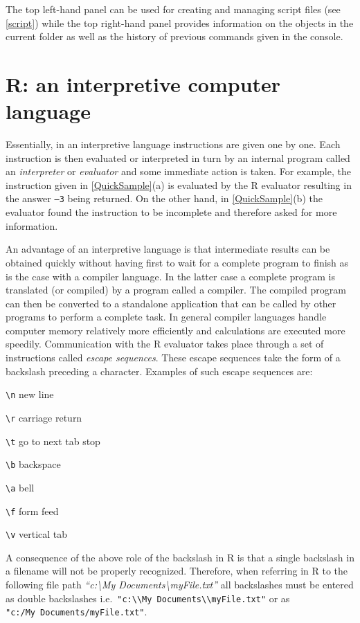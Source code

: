 \documentclass[
]{book}
\begin{document}
The top left-hand panel can be used for creating and managing script files (see \ref{script}) while the top right-hand panel provides information on the objects in the current folder as well as the history of previous commands given in the console.

\section{R: an interpretive computer language}\label{r-an-interpretive-computer-language}

Essentially, in an interpretive language instructions are given one by one. Each instruction is then evaluated or interpreted in turn by an internal program called an \emph{{interpreter}} or \emph{{evaluator}} and some immediate action is taken. For example, the instruction given in \ref{QuickSample}(a) is evaluated by the R evaluator resulting in the answer \texttt{–3} being returned. On the other hand, in \ref{QuickSample}(b) the evaluator found the instruction to be incomplete and therefore asked for more information.

An advantage of an interpretive language is that intermediate results can be obtained quickly without having first to wait for a complete program to finish as is the case with a compiler language. In the latter case a complete program is translated (or compiled) by a program called a compiler. The compiled program can then be converted to a standalone application that can be called by other programs to perform a complete task. In general compiler languages handle computer memory relatively more efficiently and calculations are executed more speedily.
Communication with the R evaluator takes place through a set of instructions called \emph{{escape sequences}}. These escape sequences take the form of a backslash preceding a character. Examples of such escape sequences are:

\texttt{\textbackslash{}n} new line

\texttt{\textbackslash{}r} carriage return

\texttt{\textbackslash{}t} go to next tab stop

\texttt{\textbackslash{}b} backspace

\texttt{\textbackslash{}a} bell

\texttt{\textbackslash{}f} form feed

\texttt{\textbackslash{}v} vertical tab

A consequence of the above role of the backslash in R is that a single backslash in a filename will not be properly recognized. Therefore, when referring in R to the following file path \emph{{``c:\textbackslash My Documents\textbackslash myFile.txt''}} all backslashes must be entered as double backslashes i.e.~\texttt{"c:\textbackslash{}\textbackslash{}My\ Documents\textbackslash{}\textbackslash{}myFile.txt"} or as \texttt{"c:/My\ Documents/myFile.txt"}.
\end{document}
